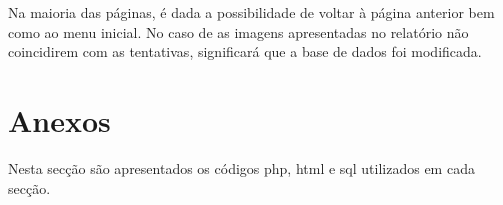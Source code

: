 \documentclass[a4paper]{article}
\begin{document}
Na maioria das páginas, é dada a possibilidade de voltar à página anterior bem como ao menu inicial.
\vskip 9mm
No caso de as imagens apresentadas no relatório não coincidirem com as tentativas, significará que a base de dados foi modificada.
\pagebreak
\section{Anexos}
Nesta secção são apresentados os códigos php, html e sql utilizados em cada secção.
\end{document}
